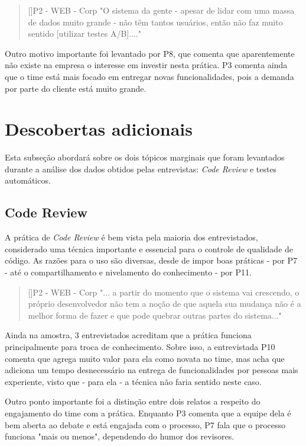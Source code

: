 \begin{quotation}[]{P2 - WEB - Corp}
    "O sistema da gente - apesar de lidar com uma massa de dados muito grande - não têm tantos usuários, então não faz muito sentido [utilizar testes A/B]...."
\end{quotation}

Outro motivo importante foi levantado por P8, que comenta que aparentemente não existe na empresa o interesse em investir nesta prática. P3 comenta ainda que o time está mais focado em entregar novas funcionalidades, pois a demanda por parte do cliente está muito grande.

\section{Descobertas adicionais}

Esta subseção abordará sobre os dois tópicos marginais que foram levantados durante a análise dos dados obtidos pelas entrevistas: \emph{Code Review} e testes automáticos.

\subsection{Code Review}

A prática de \emph{Code Review} é bem vista pela maioria dos entrevistados, considerado uma técnica importante e essencial para o controle de qualidade de código. As razões para o uso são diversas, desde de impor boas práticas - por P7 - até o compartilhamento e nivelamento do conhecimento - por P11.

\begin{quotation}[]{P2 - WEB - Corp}
    "... a partir do momento que o sistema vai crescendo, o próprio desenvolvedor não tem a noção de que aquela sua mudança não é a melhor forma de fazer e que pode quebrar outras partes do sistema..."
\end{quotation}

Ainda na amostra, 3 entrevistados acreditam que a prática funciona principalmente para troca de conhecimento. Sobre isso, a entrevistada P10 comenta que agrega muito valor para ela como novata no time, mas acha que adiciona um tempo desnecessário na entrega de funcionalidades por pessoas mais experiente, visto que - para ela - a técnica não faria sentido neste caso.

Outro ponto importante foi a distinção entre dois relatos a respeito do engajamento do time com a prática. Enquanto P3 comenta que a equipe dela é bem aberta ao debate e está engajada com o processo, P7 fala que o processo funciona "mais ou menos", dependendo do humor dos revisores.

